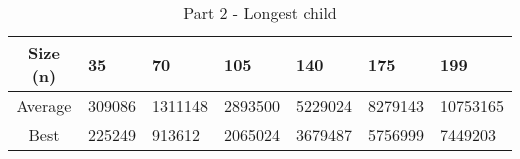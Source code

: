 \begin{table}[h!]
\begin{center}
\begin{tabular}{|c|m{1cm}|m{1cm}|m{1cm}|m{1cm}|m{1cm}|m{1.2cm}|} 
 \hline
 Size (n) & 35 & 70 & 105 & 140 & 175 & 199 \\
 \hline\hline
 Average & 309086 & 1311148 & 2893500 & 5229024 & 8279143 & 10753165 \\
 \hline
 Best & 225249 & 913612 & 2065024 & 3679487 & 5756999 & 7449203 \\
 \hline
\end{tabular}
\label{path_table}
\caption{Part 2 - Longest child}
\end{center}
\end{table}
